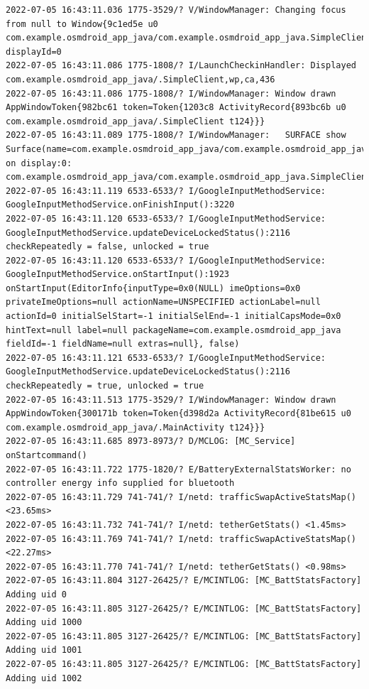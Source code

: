 \documentclass[a4paper,12pt]{book}
\begin{document}
\begin{lstlisting}
2022-07-05 16:43:11.036 1775-3529/? V/WindowManager: Changing focus from null to Window{9c1ed5e u0 com.example.osmdroid_app_java/com.example.osmdroid_app_java.SimpleClient} displayId=0
2022-07-05 16:43:11.086 1775-1808/? I/LaunchCheckinHandler: Displayed com.example.osmdroid_app_java/.SimpleClient,wp,ca,436
2022-07-05 16:43:11.086 1775-1808/? I/WindowManager: Window drawn AppWindowToken{982bc61 token=Token{1203c8 ActivityRecord{893bc6b u0 com.example.osmdroid_app_java/.SimpleClient t124}}}
2022-07-05 16:43:11.089 1775-1808/? I/WindowManager:   SURFACE show Surface(name=com.example.osmdroid_app_java/com.example.osmdroid_app_java.SimpleClient)/@0xdc0965b on display:0: com.example.osmdroid_app_java/com.example.osmdroid_app_java.SimpleClient
2022-07-05 16:43:11.119 6533-6533/? I/GoogleInputMethodService: GoogleInputMethodService.onFinishInput():3220 
2022-07-05 16:43:11.120 6533-6533/? I/GoogleInputMethodService: GoogleInputMethodService.updateDeviceLockedStatus():2116 checkRepeatedly = false, unlocked = true
2022-07-05 16:43:11.120 6533-6533/? I/GoogleInputMethodService: GoogleInputMethodService.onStartInput():1923 onStartInput(EditorInfo{inputType=0x0(NULL) imeOptions=0x0 privateImeOptions=null actionName=UNSPECIFIED actionLabel=null actionId=0 initialSelStart=-1 initialSelEnd=-1 initialCapsMode=0x0 hintText=null label=null packageName=com.example.osmdroid_app_java fieldId=-1 fieldName=null extras=null}, false)
2022-07-05 16:43:11.121 6533-6533/? I/GoogleInputMethodService: GoogleInputMethodService.updateDeviceLockedStatus():2116 checkRepeatedly = true, unlocked = true
2022-07-05 16:43:11.513 1775-3529/? I/WindowManager: Window drawn AppWindowToken{300171b token=Token{d398d2a ActivityRecord{81be615 u0 com.example.osmdroid_app_java/.MainActivity t124}}}
2022-07-05 16:43:11.685 8973-8973/? D/MCLOG: [MC_Service] onStartcommand()
2022-07-05 16:43:11.722 1775-1820/? E/BatteryExternalStatsWorker: no controller energy info supplied for bluetooth
2022-07-05 16:43:11.729 741-741/? I/netd: trafficSwapActiveStatsMap() <23.65ms>
2022-07-05 16:43:11.732 741-741/? I/netd: tetherGetStats() <1.45ms>
2022-07-05 16:43:11.769 741-741/? I/netd: trafficSwapActiveStatsMap() <22.27ms>
2022-07-05 16:43:11.770 741-741/? I/netd: tetherGetStats() <0.98ms>
2022-07-05 16:43:11.804 3127-26425/? E/MCINTLOG: [MC_BattStatsFactory] Adding uid 0
2022-07-05 16:43:11.805 3127-26425/? E/MCINTLOG: [MC_BattStatsFactory] Adding uid 1000
2022-07-05 16:43:11.805 3127-26425/? E/MCINTLOG: [MC_BattStatsFactory] Adding uid 1001
2022-07-05 16:43:11.805 3127-26425/? E/MCINTLOG: [MC_BattStatsFactory] Adding uid 1002

\end{lstlisting}
\end{document}

